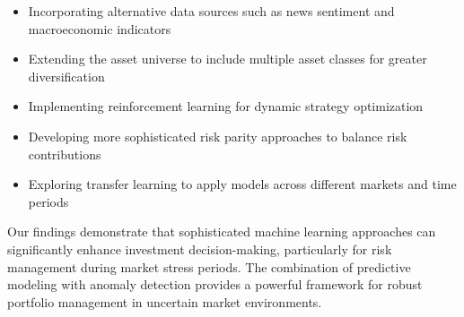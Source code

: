 \documentclass[13pt]{article}
\begin{document}
\begin{itemize}
	\item Incorporating alternative data sources such as news sentiment and macroeconomic indicators
	\item Extending the asset universe to include multiple asset classes for greater diversification
	\item Implementing reinforcement learning for dynamic strategy optimization
	\item Developing more sophisticated risk parity approaches to balance risk contributions
	\item Exploring transfer learning to apply models across different markets and time periods
\end{itemize}

Our findings demonstrate that sophisticated machine learning approaches can significantly enhance investment decision-making, particularly for risk management during market stress periods. The combination of predictive modeling with anomaly detection provides a powerful framework for robust portfolio management in uncertain market environments.
\end{document}
